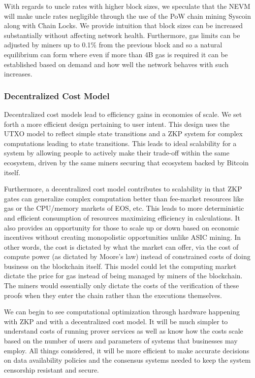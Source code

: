 \documentclass[peerreview]{ieeesyscoin}
\begin{document}
With regards to uncle rates with higher block sizes, we speculate that the NEVM will make uncle rates negligible through the use of the PoW chain mining Syscoin along with Chain Locks. We provide intuition that block sizes can be increased substantially without affecting network health. Furthermore, gas limits can be adjusted by miners up to 0.1\% from the previous block and so a natural equilibrium can form where even if more than 4B gas is required it can be established based on demand and how well the network behaves with such increases. 

\subsubsection{Decentralized Cost Model}

Decentralized cost models lead to efficiency gains in economies of scale. We set forth a more efficient design pertaining to user intent. This design uses the UTXO model to reflect simple state transitions and a ZKP system for complex computations leading to state transitions. This leads to ideal scalability for a system by allowing people to actively make their trade-off within the same ecosystem, driven by the same miners securing that ecosystem backed by Bitcoin itself.

Furthermore, a decentralized cost model contributes to scalability in that ZKP gates can generalize complex computation better than fee-market resources like gas or the CPU/memory markets of EOS, etc. This leads to more deterministic and efficient consumption of resources maximizing efficiency in calculations. It also provides an opportunity for those to scale up or down based on economic incentives without creating monopolistic opportunities unlike ASIC mining. In other words, the cost is dictated by what the market can offer, via the cost of compute power (as dictated by Moore's law) instead of constrained costs of doing business on the blockchain itself. This model could let the computing market dictate the price for gas instead of being managed by miners of the blockchain. The miners would essentially only dictate the costs of the verification of these proofs when they enter the chain rather than the executions themselves.

We can begin to see computational optimization through hardware happening with ZKP and with a decentralized cost model. It will be much simpler to understand costs of running prover services as well as know how the costs scale based on the number of users and parameters of systems that businesses may employ. All things considered, it will be more efficient to make accurate decisions on data availability policies and the consensus systems needed to keep the system censorship resistant and secure.
\end{document}
